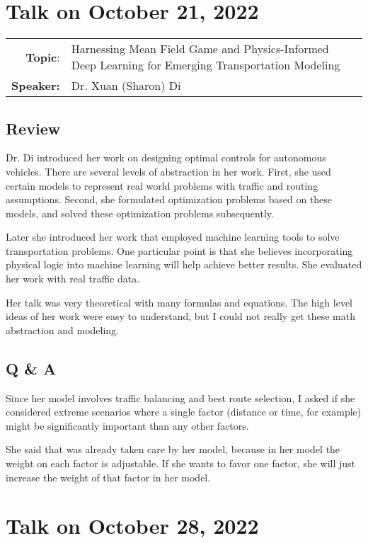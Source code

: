 \documentclass[11pt, oneside]{article}   	%
\begin{document}
\newpage
\section{Talk on October 21, 2022}

\begin{tabularx} {\textwidth}{r X}
\textbf{Topic}: & Harnessing Mean Field Game and Physics-Informed Deep Learning for Emerging Transportation Modeling\\
\textbf{Speaker:} & Dr. Xuan (Sharon) Di \\
\end{tabularx}

\subsection{Review}
Dr. Di introduced her work on designing optimal controls for autonomous vehicles. There are several levels of abstraction in her work. First, she used certain models to represent real world problems with traffic and routing assumptions. Second, she formulated optimization problems based on these models, and solved these optimization problems subsequently. 

Later she introduced her work that employed machine learning tools to solve transportation problems. One particular point is that she believes incorporating physical logic into machine learning will help achieve better results. She evaluated her work with real traffic data. 

Her talk was very theoretical with many formulas and equations. The high level ideas of her work were easy to understand, but I could not really get these math abstraction and modeling. 



\subsection{Q \& A}
Since her model involves traffic balancing and best route selection, I asked if she considered extreme scenarios where a single factor (distance or time, for example) might be significantly important than any other factors. 

She said that was already taken care by her model, because in her model the weight on each factor is adjustable. If she wants to favor one factor, she will just increase the weight of that factor in her model.

\newpage
\section{Talk on October 28, 2022}
\end{document}
